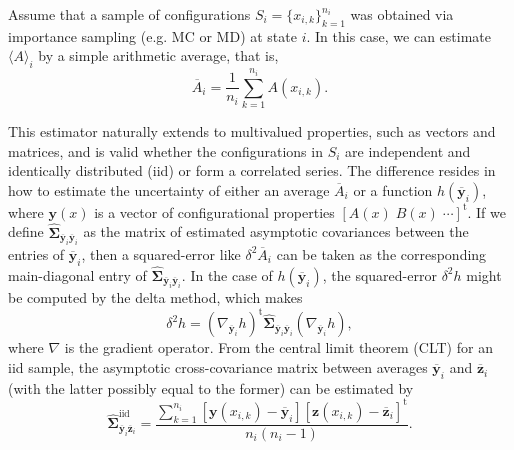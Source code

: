 \documentclass[aip,jcp,reprint,amsmath,amssymb]{revtex4-1}
\newcommand{\mt}[1]{\boldsymbol{\mathbf{#1}}}           %
\newcommand{\vt}[1]{\boldsymbol{\mathbf{#1}}}           %
\newcommand{\tr}[1]{#1^\text{t}}                        %
\begin{document}
Assume that a sample of configurations $S_i = \{x_{i,k}\}_{k=1}^{n_i}$ was obtained via importance sampling\cite{Allen_1987} (e.g. MC or MD) at state $i$. In this case, we can estimate $\langle A \rangle_i$ by a simple arithmetic average, that is,
\begin{equation}
\label{eq:average_estimator}
\overline A_i = \frac{1}{n_i} \sum_{k=1}^{n_i} A(x_{i,k}).
\end{equation}

This estimator naturally extends to multivalued properties, such as vectors and matrices, and is valid whether the configurations in $S_i$ are independent and identically distributed (iid) or form a correlated series. The difference resides in how to estimate the uncertainty of either an average $\overline A_i$ or a function $h(\overline {\vt y}_i)$, where $\vt y(x)$ is a vector of configurational properties $\tr{[A(x) \; B(x) \; \cdots]}$. If we define $\hat{\mt \Sigma}_{\overline{\vt y}_i\overline{\vt y}_i}$ as the matrix of estimated asymptotic covariances between the entries of $\overline{\vt y}_i$, then a squared-error like $\delta^2 \overline A_i$ can be taken as the corresponding main-diagonal entry of $\hat{\mt \Sigma}_{\overline{\vt y}_i\overline{\vt y}_i}$. In the case of $h(\overline{\vt y}_i)$, the squared-error $\delta^2 h$ might be computed by the delta method,\cite{Greene_2012} which makes
\begin{equation}
\label{eq:delta method}
\delta^2 h = \tr{(\nabla_{\overline{\vt y}_i} h)} \hat{\mt \Sigma}_{\overline{\vt y}_i\overline{\vt y}_i}(\nabla_{\overline{\vt y}_i} h),
\end{equation} 
where $\nabla$ is the gradient operator. From the central limit theorem (CLT) for an iid sample, the asymptotic cross-covariance matrix between averages $\overline{\vt y}_i$ and $\overline{\vt z}_i$ (with the latter possibly equal to the former) can be estimated by
\begin{equation*}
\label{eq:asymptotic covariance IID}
\hat{\mt \Sigma}^\text{iid}_{\overline{\vt y}_i\overline{\vt z}_i} = \frac{\sum\limits_{k=1}^{n_i} \left[\vt y(x_{i,k}) - \overline{\vt y}_i\right] \tr{\left[\vt z(x_{i,k}) - \overline{\vt z}_i\right]}}{n_i(n_i - 1)}.
\end{equation*}
\end{document}
